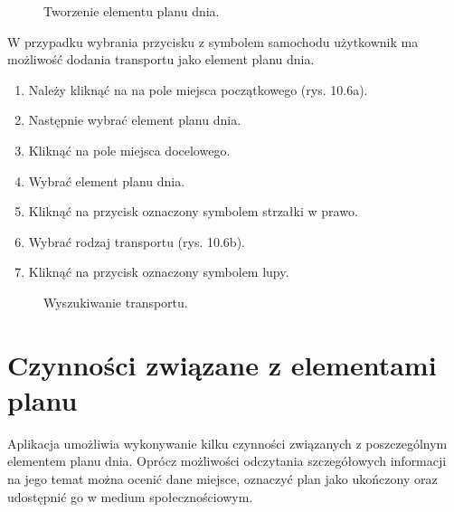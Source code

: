 \begin{figure}[h]

\centering
\null\hfill
{}
\hfill
{}
\hfill
{}
\hfill\null

\null\hfill
\centering
{}
\hfill
{}
\hfill\null
\caption{Tworzenie elementu planu dnia.}
\label{fig:podrecznik7}
\end{figure}
\FloatBarrier

W przypadku wybrania przycisku z symbolem samochodu użytkownik ma możliwość dodania transportu jako element planu dnia.
\begin{enumerate}
\item Należy kliknąć na na pole miejsca początkowego (rys. 10.6a).
\item Następnie wybrać element planu dnia.
\item Kliknąć na pole miejsca docelowego.
\item Wybrać element planu dnia.
\item Kliknąć na przycisk oznaczony symbolem strzałki w prawo.
\item Wybrać rodzaj transportu (rys. 10.6b).
\item Kliknąć na przycisk oznaczony symbolem lupy.
\end{enumerate}

\begin{figure}[h]

\centering
\null\hfill
{}
\hfill
{}
\hfill\null

\caption{Wyszukiwanie transportu.}
\label{fig:podrecznik12}
\end{figure}
\FloatBarrier


\section{Czynności związane z elementami planu}
Aplikacja umożliwia wykonywanie kilku czynności związanych z poszczególnym elementem planu dnia. Oprócz możliwości odczytania szczegółowych informacji na jego temat można ocenić dane miejsce, oznaczyć plan jako ukończony oraz udostępnić go w medium społecznościowym.

